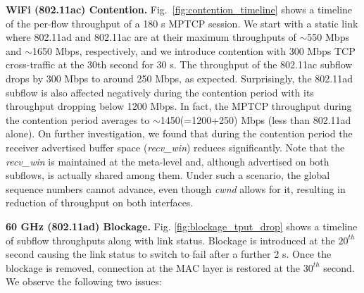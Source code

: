 \noindent\textbf{WiFi (802.11ac) Contention. } Fig.~\ref{fig:contention_timeline} shows a timeline of the
per-flow throughput of a 180 s MPTCP session. We start with a static link where 802.11ad and 802.11ac are 
at their maximum throughputs of $\sim$550 Mbps and $\sim$1650 Mbps, respectively, and we introduce
contention with 300 Mbps TCP cross-traffic at the 30th second for 30 s. The throughput of the 
802.11ac subflow drops by 300 Mbps to around 250 Mbps, as expected. Surprisingly, the 802.11ad subflow is also
affected negatively during the contention period with its throughput dropping below 1200 Mbps.
In fact, the MPTCP throughput during the contention period averages to $\sim$1450(=1200+250) Mbps (less than 802.11ad alone). 
On further investigation, we found that during the contention period the receiver advertised buffer space (\emph{recv\_win}) reduces significantly. 
Note that the \emph{recv\_win} is maintained at the meta-level and, although advertised on both subflows, is actually shared 
among them. Under such a scenario, the global sequence numbers
cannot advance, even though \emph{cwnd} allows for it,
resulting in reduction of throughput on both interfaces.

\begin{figure*}[t]
    \centering
    \hfill
    \hfill
    \vspace{-0.15in}
    \caption{\name}
    \vspace{-0.1in}
\end{figure*}
\fi

\noindent\textbf{60 GHz (802.11ad) Blockage. }
Fig. \ref{fig:blockage_tput_drop} shows a timeline of subflow
throughputs along with link status.
Blockage is introduced at the $20^{th}$ second causing the link status to switch to fail after a
further 2 s. Once the blockage is removed, connection at the MAC layer
is restored at the $30^{th}$ second. We observe the following two
issues:

